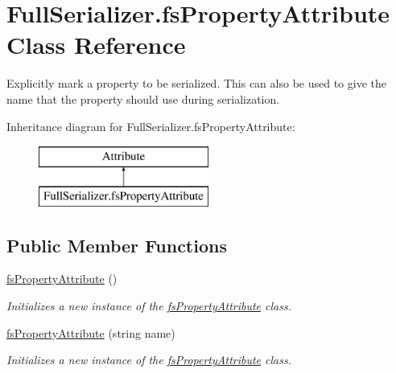 \hypertarget{class_full_serializer_1_1fs_property_attribute}{}\section{Full\+Serializer.\+fs\+Property\+Attribute Class Reference}
\label{class_full_serializer_1_1fs_property_attribute}


Explicitly mark a property to be serialized. This can also be used to give the name that the property should use during serialization.  


Inheritance diagram for Full\+Serializer.\+fs\+Property\+Attribute\+:\begin{figure}[H]
\begin{center}
\leavevmode
\includegraphics[height=2.000000cm]{class_full_serializer_1_1fs_property_attribute}
\end{center}
\end{figure}
\subsection*{Public Member Functions}
\begin{DoxyCompactItemize}
\item 
\hyperlink{class_full_serializer_1_1fs_property_attribute_a29fe552a06d5ad3abab158abf96f9b89}{fs\+Property\+Attribute} ()
\begin{DoxyCompactList}\small\item\em Initializes a new instance of the \hyperlink{class_full_serializer_1_1fs_property_attribute}{fs\+Property\+Attribute} class. \end{DoxyCompactList}\item 
\hyperlink{class_full_serializer_1_1fs_property_attribute_a2ea92a57d2bba0030b7dd6cd5b1d04f7}{fs\+Property\+Attribute} (string name)
\begin{DoxyCompactList}\small\item\em Initializes a new instance of the \hyperlink{class_full_serializer_1_1fs_property_attribute}{fs\+Property\+Attribute} class. \end{DoxyCompactList}\end{DoxyCompactItemize}
